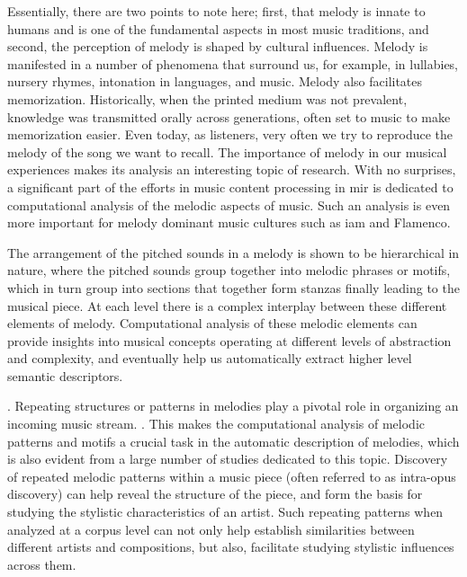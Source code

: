 Essentially, there are two points to note here; first, that melody is innate to humans and is one of the fundamental aspects in most music traditions, and second, the perception of melody is shaped by cultural influences. Melody is manifested in a number of phenomena that surround us, for example, in lullabies, nursery rhymes, intonation in languages, and music. Melody also facilitates memorization. Historically, when the printed medium was not prevalent, knowledge was transmitted orally across generations, often set to music to make memorization easier. Even today, as listeners, very often we try to reproduce the melody of the song we want to recall. The importance of melody in our musical experiences makes its analysis an interesting topic of research. With no surprises, a significant part of the efforts in music content processing in \gls{mir} is dedicated to computational analysis of the melodic aspects of music. Such an analysis is even more important for melody dominant music cultures such as \gls{iam} and Flamenco.

The arrangement of the pitched sounds in a melody is shown to be hierarchical in nature, where the pitched sounds group together into melodic phrases or motifs, which in turn group into sections that together form stanzas finally leading to the musical piece. At each level there is a complex interplay between these different elements of melody. Computational analysis of these melodic elements can provide insights into musical concepts operating at different levels of abstraction and complexity, and eventually help us automatically extract higher level semantic descriptors.

. Repeating structures or patterns in melodies play a pivotal role in organizing an incoming music stream. . This makes the computational analysis of melodic patterns and motifs a crucial task in the automatic description of melodies, which is also evident from a large number of studies dedicated to this topic. Discovery of repeated melodic patterns within a music piece (often referred to as intra-opus discovery) can help reveal the structure of the piece, and form the basis for studying the stylistic characteristics of an artist. Such repeating patterns when analyzed at a corpus level can not only help establish similarities between different artists and compositions, but also, facilitate studying stylistic influences across them. 

